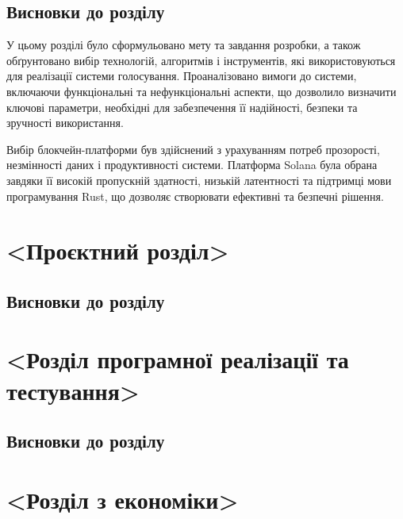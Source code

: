 \documentclass[14pt]{extreport}
\begin{document}
  \section{Висновки до розділу}
  
  У цьому розділі було сформульовано мету та завдання розробки, а також обґрунтовано вибір технологій, алгоритмів і інструментів, які використовуються для реалізації системи голосування. Проаналізовано вимоги до системи, включаючи функціональні та нефункціональні аспекти, що дозволило визначити ключові параметри, необхідні для забезпечення її надійності, безпеки та зручності використання. 

  Вибір блокчейн-платформи був здійснений з урахуванням потреб прозорості, незмінності даних і продуктивності системи. Платформа Solana була обрана завдяки її високій пропускній здатності, низькій латентності та підтримці мови програмування Rust, що дозволяє створювати ефективні та безпечні рішення.

  \chapter{<Проєктний розділ>}

  \section{}
  \section{Висновки до розділу}
  
  \chapter{<Розділ програмної реалізації та тестування>}
  
  \section{}
  \section{Висновки до розділу}
  
  \chapter{<Розділ з економіки>}
  
\end{document}
